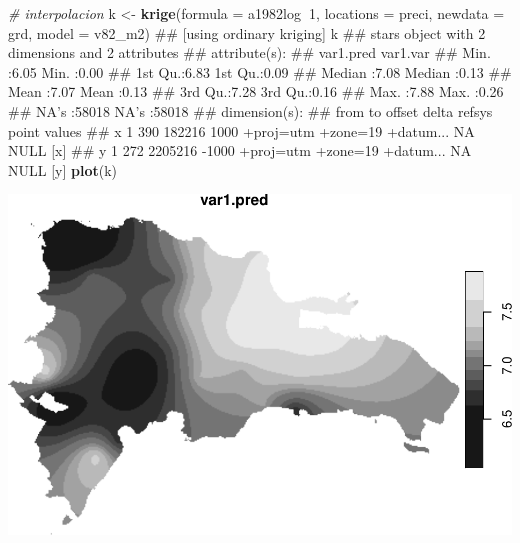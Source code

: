 \documentclass[11pt,]{article}
\newenvironment{Shaded}{\begin{snugshade}}{\end{snugshade}}
\newcommand{\KeywordTok}[1]{\textcolor[rgb]{0.13,0.29,0.53}{\textbf{#1}}}
\newcommand{\DataTypeTok}[1]{\textcolor[rgb]{0.13,0.29,0.53}{#1}}
\newcommand{\DecValTok}[1]{\textcolor[rgb]{0.00,0.00,0.81}{#1}}
\newcommand{\StringTok}[1]{\textcolor[rgb]{0.31,0.60,0.02}{#1}}
\newcommand{\CommentTok}[1]{\textcolor[rgb]{0.56,0.35,0.01}{\textit{#1}}}
\newcommand{\OperatorTok}[1]{\textcolor[rgb]{0.81,0.36,0.00}{\textbf{#1}}}
\newcommand{\NormalTok}[1]{#1}
\begin{document}
\begin{Shaded}
\begin{Highlighting}[]

\CommentTok{# interpolacion}
\NormalTok{k <-}\StringTok{ }\KeywordTok{krige}\NormalTok{(}\DataTypeTok{formula =}\NormalTok{ a1982log}\OperatorTok{~}\DecValTok{1}\NormalTok{, }\DataTypeTok{locations =}\NormalTok{ preci, }\DataTypeTok{newdata =}\NormalTok{ grd, }\DataTypeTok{model =}\NormalTok{ v82_m2)}
\NormalTok{## [using ordinary kriging]}
\NormalTok{k}
\NormalTok{## stars object with 2 dimensions and 2 attributes}
\NormalTok{## attribute(s):}
\NormalTok{##    var1.pred       var1.var     }
\NormalTok{##  Min.   :6.05    Min.   :0.00   }
\NormalTok{##  1st Qu.:6.83    1st Qu.:0.09   }
\NormalTok{##  Median :7.08    Median :0.13   }
\NormalTok{##  Mean   :7.07    Mean   :0.13   }
\NormalTok{##  3rd Qu.:7.28    3rd Qu.:0.16   }
\NormalTok{##  Max.   :7.88    Max.   :0.26   }
\NormalTok{##  NA's   :58018   NA's   :58018  }
\NormalTok{## dimension(s):}
\NormalTok{##   from  to  offset delta                       refsys point values    }
\NormalTok{## x    1 390  182216  1000 +proj=utm +zone=19 +datum...    NA   NULL [x]}
\NormalTok{## y    1 272 2205216 -1000 +proj=utm +zone=19 +datum...    NA   NULL [y]}
\KeywordTok{plot}\NormalTok{(k)}
\end{Highlighting}
\end{Shaded}

\includegraphics[width=1\linewidth]{img/unnamed-chunk-16-2}
\end{document}
